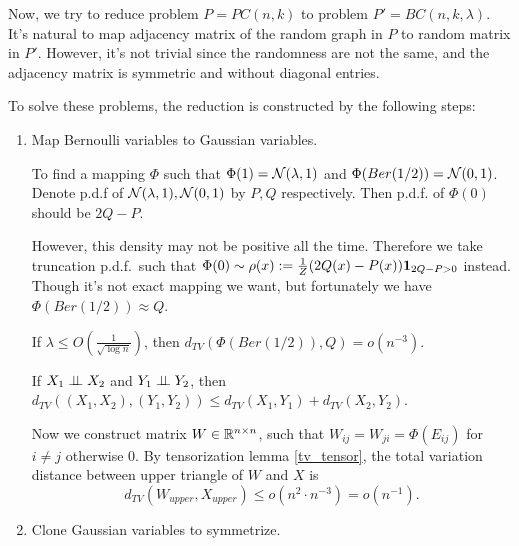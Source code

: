 Now, we try to reduce problem $P=PC(n,k)$ to problem $P'=BC(n,k,\lambda)$. 
It's natural to map adjacency matrix of the random graph in $P$ to random matrix in $P'$. 
However, it's not trivial since the randomness are not the same, and the adjacency matrix is symmetric and without diagonal entries.

To solve these problems, the reduction is constructed by the following steps:
\begin{enumerate}
    \item Map Bernoulli variables to Gaussian variables.
    
        To find a mapping $\Phi$ such that $\Phi(1)=\mathcal{N}(\lambda,1)$ and $\Phi(Ber(1/2))=\mathcal{N}(0,1)$. 
        Denote p.d.f of $\mathcal{N}(\lambda,1),\mathcal{N}(0,1)$ by $P,Q$ respectively. Then p.d.f. of $\Phi(0)$ should be $2Q-P$.

        However, this density may not be positive all the time. Therefore we take truncation p.d.f.\ such that $\Phi(0)\sim\rho(x):=\frac{1}{Z}(2Q(x)-P(x))\mathbf{1}_{2Q-P>0}$ instead.
        Though it's not exact mapping we want, but fortunately we have $\Phi(Ber(1/2))\approx Q$.
        \begin{lem}
            \label{ber_to_gau_trunc_approx}
            If $\lambda\le O(\frac{1}{\sqrt{\log n}})$, then $d_{TV}(\Phi(Ber(1/2)),Q)=o(n^{-3})$.
        \end{lem}
        \begin{lem}
            \label{tv_tensor}
            If $X_1\perp \!\!\! \perp X_2$ and $Y_1\perp \!\!\! \perp Y_2$, then $d_{TV}((X_1,X_2),(Y_1,Y_2))\le d_{TV}(X_1,Y_1)+d_{TV}(X_2,Y_2)$.
        \end{lem}
        Now we construct matrix $W\in\mathbb{R}^{n\times n}$, such that $W_{ij}=W_{ji}=\Phi(E_{ij})$ for $i\neq j$ otherwise $0$.
        By tensorization lemma \ref{tv_tensor}, the total variation distance between upper triangle of $W$ and $X$ is
        \[d_{TV}(W_{upper},X_{upper})\le o(n^2\cdot n^{-3})=o(n^{-1}).\]

    \item Clone Gaussian variables to symmetrize.
        

\end{enumerate}
